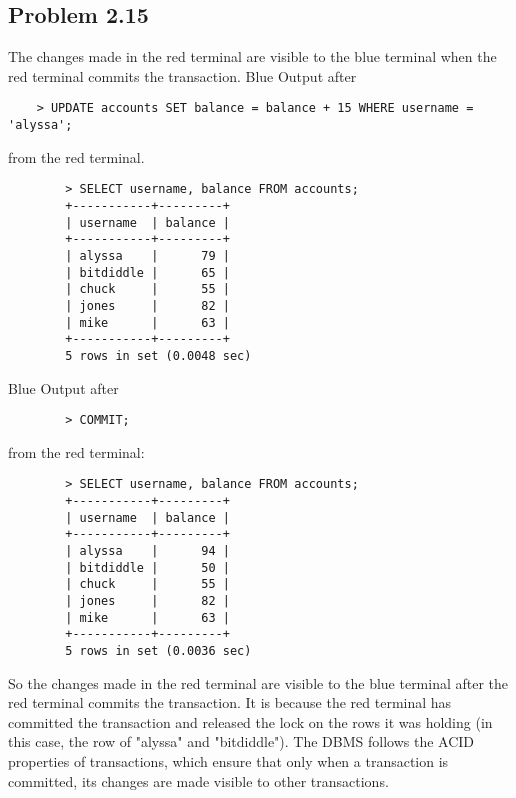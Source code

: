\documentclass{article}
\begin{document}
\begin{CJK*}{UTF8}{gbsn}
    \section*{Problem 2.15}
    The changes made in the red terminal are visible to the blue terminal
    when the red terminal commits the transaction.
    Blue Output after 
    \begin{lstlisting}
    > UPDATE accounts SET balance = balance + 15 WHERE username = 'alyssa';
    \end{lstlisting}
    from the red terminal.
    \begin{lstlisting}
        > SELECT username, balance FROM accounts;
        +-----------+---------+
        | username  | balance |
        +-----------+---------+
        | alyssa    |      79 |
        | bitdiddle |      65 |
        | chuck     |      55 |
        | jones     |      82 |
        | mike      |      63 |
        +-----------+---------+
        5 rows in set (0.0048 sec)
    \end{lstlisting}
    Blue Output after
    \begin{lstlisting}
        > COMMIT;
    \end{lstlisting}
    from the red terminal:
    \begin{lstlisting}
        > SELECT username, balance FROM accounts;
        +-----------+---------+
        | username  | balance |
        +-----------+---------+
        | alyssa    |      94 |
        | bitdiddle |      50 |
        | chuck     |      55 |
        | jones     |      82 |
        | mike      |      63 |
        +-----------+---------+
        5 rows in set (0.0036 sec)
    \end{lstlisting}
    So the changes made in the red terminal are visible to the blue terminal
    after the red terminal commits the transaction. It is because the red
    terminal has committed the transaction and released the lock on the
    rows it was holding (in this case, the row of "alyssa" and "bitdiddle"). The DBMS
    follows the ACID properties of transactions, which ensure that only when a
    transaction is committed, its changes are made visible to other transactions.
        
\end{CJK*}
\end{document}
